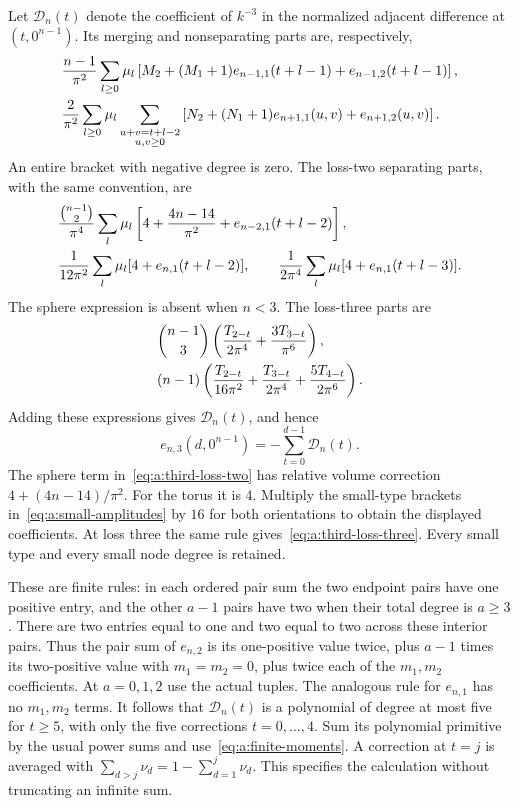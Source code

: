 \documentclass[a4paper,10pt]{article}
\numberwithin{equation}{section}
\theoremstyle{paperplain}
\theoremstyle{paperremark}
\theoremstyle{paperplain}
\begin{document}
Let $\mathcal D_n(t)$ denote the coefficient of $k^{-3}$ in the normalized
adjacent difference at $(t,0^{n-1})$. Its merging and nonseparating
parts are, respectively,
\begin{align}
 &\frac{n-1}{\pi^2}\sum_{l\geq0}\mu_l
 \left[M_2+(M_1+1)e_{n-1,1}(t+l-1)
                            +e_{n-1,2}(t+l-1)\right],\notag\\
 &\frac2{\pi^2}\sum_{l\geq0}\mu_l
 \sum_{\substack{u+v=t+l-2\\u,v\geq0}}
 \left[N_2+(N_1+1)e_{n+1,1}(u,v)+e_{n+1,2}(u,v)\right].
 \label{eq:a:third-merge-split}
\end{align}
An entire bracket with negative degree is zero. The loss-two separating
parts, with the same convention, are
\begin{align}
 &\frac{\binom{n-1}{2}}{\pi^4}\sum_l\mu_l
 \left[4+\frac{4n-14}{\pi^2}+e_{n-2,1}(t+l-2)\right],\notag\\
 &\frac1{12\pi^2}\sum_l\mu_l[4+e_{n,1}(t+l-2)],\qquad
 \frac1{2\pi^4}\sum_l\mu_l[4+e_{n,1}(t+l-3)].
 \label{eq:a:third-loss-two}
\end{align}
The sphere expression is absent when $n<3$. The loss-three parts are
\begin{align}
 &\binom{n-1}{3}\left(\frac{T_{2-t}}{2\pi^4}
                                      +\frac{3T_{3-t}}{\pi^6}\right),\notag\\
 &(n-1)\left(\frac{T_{2-t}}{16\pi^2}
             +\frac{T_{3-t}}{2\pi^4}+\frac{5T_{4-t}}{2\pi^6}\right).
 \label{eq:a:third-loss-three}
\end{align}
Adding these expressions gives $\mathcal D_n(t)$, and hence
\begin{equation}\label{eq:a:third-primitive}
 e_{n,3}(d,0^{n-1})=-\sum_{t=0}^{d-1}\mathcal D_n(t).
\end{equation}
The sphere term in~\eqref{eq:a:third-loss-two} has relative volume
correction $4+(4n-14)/\pi^2$. For the torus it is $4$. Multiply the
small-type brackets in~\eqref{eq:a:small-amplitudes} by $16$ for both
orientations to obtain the displayed coefficients. At loss three the
same rule gives~\eqref{eq:a:third-loss-three}. Every small type and
every small node degree is retained.

These are finite rules: in each ordered pair sum the two endpoint pairs
have one positive entry, and the other $a-1$ pairs have two when their
total degree is $a\geq3$. There are two entries equal to one and two
equal to two across these interior pairs. Thus the pair sum of
$e_{n,2}$ is its one-positive value twice, plus $a-1$ times its
two-positive value with $m_1=m_2=0$, plus twice each of the $m_1,m_2$
coefficients. At $a=0,1,2$ use the actual tuples. The analogous rule
for $e_{n,1}$ has no $m_1,m_2$ terms. It follows that $\mathcal D_n(t)$ is a
polynomial of degree at most five for $t\geq5$, with only the five
corrections $t=0,\ldots,4$. Sum its polynomial primitive by the usual
power sums and use~\eqref{eq:a:finite-moments}. A correction at $t=j$
is averaged with $\sum_{d>j}\nu_d=1-\sum_{d=1}^j\nu_d$.
This specifies the calculation without truncating an infinite sum.
\end{document}
